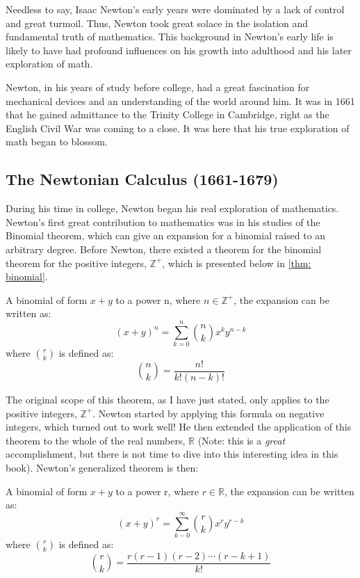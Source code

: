Needless to say, Isaac Newton's early years were dominated by a lack of control and great turmoil. Thus, Newton took great solace in the isolation and fundamental truth of mathematics. This background in Newton's early life is likely to have had profound influences on his growth into adulthood and his later exploration of math.

Newton, in his years of study before college, had a great fascination for mechanical devices and an understanding of the world around him. It was in 1661 that he gained admittance to the Trinity College in Cambridge, right as the English Civil War was coming to a close. It was here that his true exploration of math began to blossom.

\subsection{The Newtonian Calculus (1661-1679)}

During his time in college, Newton began his real exploration of mathematics. Newton's first great contribution to mathematics was in his studies of the Binomial theorem, which can give an expansion for a binomial raised to an arbitrary degree. Before Newton, there existed a theorem for the binomial theorem for the positive integers, $\mathbb{Z}^+$, which is presented below in \autoref{thm: binomial}.

\begin{theorem}\label{thm: binomial}
    A binomial of form $x+y$ to a power n, where $n\in\mathbb{Z}^+$, the expansion can be written as:
    $$(x+y)^n=\sum_{k=0}^{n}\binom{n} {k}x^ky^{n-k}$$
    where $\binom{r}{k}$ is defined as:
    $$\binom{n}{k}=\frac{n!}{k!(n-k)!}$$
\end{theorem}

The original scope of this theorem, as I have just stated, only applies to the positive integers, $\mathbb{Z}^+$. Newton started by applying this formula on negative integers, which turned out to work well! He then extended the application of this theorem to the whole of the real numbers, $\mathbb{R}$ (Note: this is a \textit{great} accomplishment, but there is not time to dive into this interesting idea in this book). Newton's generalized theorem is then:
\begin{theorem}
    A binomial of form $x+y$ to a power r, where $r\in\mathbb{R}$, the expansion can be written as:
    $$(x+y)^r=\sum_{k-0}^{\infty}\binom{r} {k}x^ry^{r-k}$$
    where $\binom{r}{k}$ is defined as:
    $$\binom{r}{k}=\frac{r(r-1)(r-2)\cdots(r-k+1)}{k!}$$
\end{theorem}

